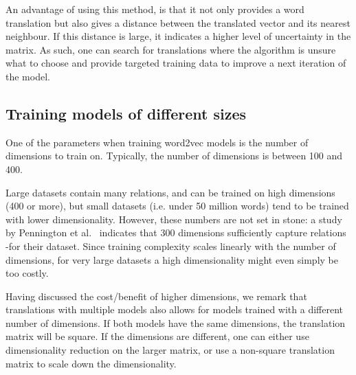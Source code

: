 An advantage of using this method, is that it not only provides a word translation but also gives a distance between the translated vector and its nearest neighbour. If this distance is large, it indicates a higher level of uncertainty in the matrix. As such, one can search for translations where the algorithm is unsure what to choose and provide targeted training data to improve a next iteration of the model.

\subsection{Training models of different sizes}
One of the parameters when training word2vec models is the number of dimensions to train on. Typically, the number of dimensions is between 100 and 400\cite{mikolov2013efficient}.

Large datasets contain many relations, and can be trained on high dimensions (400 or more), but small datasets (i.e. under 50 million words) tend to be trained with lower dimensionality. However, these numbers are not set in stone: a study by Pennington et al.~\cite{jeffreypennington2014glove} indicates that 300 dimensions sufficiently capture relations -for their dataset. Since training complexity scales linearly with the number of dimensions, for very large datasets a high dimensionality might even simply be too costly.

Having discussed the cost/benefit of higher dimensions, we remark that translations with multiple models also allows for models trained with a different number of dimensions. If both models have the same dimensions, the translation matrix will be square. If the dimensions are different, one can either use dimensionality reduction on the larger matrix, or use a non-square translation matrix to scale down the dimensionality.